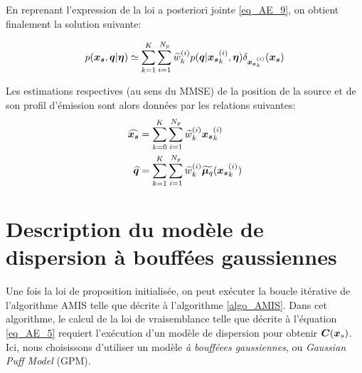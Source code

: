 {{En reprenant l'expression  de la loi a posteriori jointe \eqref{eq_AE_9}, on obtient finalement la solution suivante:

 \begin{equation}
p({\bm{x_s}}, {\bm{q}} | {\bm{\eta}}) \simeq \sum\limits_{k=1}^K \sum\limits_{i=1}^{N_p} \widetilde{w}_k^{(i)} p({\bm{q}} | {{\bm{x_s}}}_k^{(i)}, {\bm{\eta}}) \delta_{{{\bm{x_s}}}_k^{(i)}} ({\bm{x_s}})
 \label{eq_joint_posterior}
 \end{equation}

Les estimations respectives (au sens du MMSE) de la position de la source et de son profil d'émission sont alors données par les relations suivantes:
\begin{equation}
	\begin{split}
		  \widehat{{\bm{x_s}}} &= \sum\limits_{k=0}^K\sum\limits_{i=1}^{N_p} \widetilde{w}_k^{(i)}{\bm{x_s}}_{k}^{(i)} \\
		  \widehat{{\bm{q}}} &= \sum\limits_{k=1}^K \sum\limits_{i=1}^{N_p} \widetilde{w}_k^{(i)} {\widetilde{\bm{\mu}_q}}({\bm{x_s}}_k^{(i)})
	\end{split}
	\label{eq_estimateurs_mmse}
\end{equation}






}

\section{Description du modèle de dispersion à bouffées gaussiennes}

Une fois la loi de proposition initialisée, on peut exécuter la boucle itérative de l'algorithme AMIS telle que décrite à l'algorithme \ref{algo_AMIS}. Dans cet algorithme, le calcul de la loi de vraisemblance telle que décrite à l'équation \eqref{eq_AE_5} requiert l'exécution d'un modèle de dispersion pour obtenir ${\bm{C}}({\bm{x}_s})$. Ici, nous choisissons d'utiliser un modèle \textit{à boufféees gaussiennes}, ou \textit{Gaussian Puff Model} (GPM).

}
